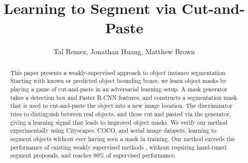 \documentclass[runningheads]{llncs}
\begin{document}
\newcommand\tal[1]{}
\newcommand\jon[1]{}
\newcommand\mbnote[1]{}

\newcommand\bb[1]{\textbf{#1}}

\newcommand{\denselist}{
\itemsep -2pt\topsep-8pt\partopsep-8pt
}

\pagestyle{headings}
\mainmatter

\title{Learning to Segment via Cut-and-Paste}

\author{Tal Remez, Jonathan Huang, Matthew Brown}


\maketitle

\begin{abstract}
This paper presents a weakly-supervised approach to object instance segmentation. Starting with known or predicted object bounding boxes, we learn object masks by playing a game of cut-and-paste in an adversarial learning setup. A mask generator takes a detection box and Faster R-CNN features, and constructs a segmentation mask that is used to cut-and-paste the object into a new image location. The discriminator tries to distinguish between real objects, and those cut and pasted via the generator, giving a learning signal that leads to improved object masks. We verify our method experimentally using Cityscapes, COCO, and aerial image datasets, learning to segment objects without ever having seen a mask in training. Our method exceeds the performance of existing weakly supervised methods \cite{rother2004grabcut,khoreva2016simple}, without requiring hand-tuned segment proposals, and reaches $90\%$ of supervised performance.
\vspace{-3mm}
\end{abstract}
\end{document}
